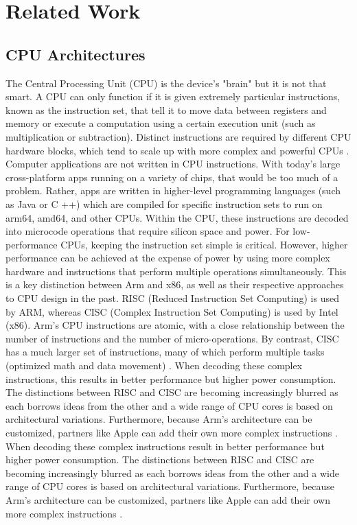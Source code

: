 \section{Related Work}


\subsection {CPU Architectures}
The Central Processing Unit (CPU) is the device's "brain" but it is not that smart.
A CPU can only function if it is given extremely particular instructions, 
known as the instruction set, 
that tell it to move data between registers and memory or execute a computation using a certain execution unit 
(such as multiplication or subtraction). 
Distinct instructions are required by different CPU hardware blocks, which tend to scale up with more complex and powerful CPUs 
\cite{Publikat0:online}.
Computer applications are not written in CPU instructions. 
With today's large cross-platform apps running on a variety of chips, that would be too much of a problem. 
Rather, apps are written in higher-level programming languages (such as Java or C ++) 
which are compiled for specific instruction sets to run on arm64, amd64, and other CPUs. 
Within the CPU, these instructions are decoded into microcode operations that require silicon space and power. 
For low-performance CPUs, keeping the instruction set simple is critical. 
However, higher performance can be achieved at the expense of power by using more complex hardware and 
instructions that perform multiple operations simultaneously. 
This is a key distinction between Arm and x86, as well as their respective approaches to CPU design in the past\cite{CPUdesig69:online}.
RISC (Reduced Instruction Set Computing) is used by ARM,
whereas CISC (Complex Instruction Set Computing) is used by Intel (x86). 
Arm's CPU instructions are atomic, with a close relationship between the number of instructions and the number of micro-operations. By contrast, CISC has a much larger set of instructions, 
many of which perform multiple tasks (optimized math and data movement)
\cite{RISCvers27:online}.
When decoding these complex instructions, this results in better performance but higher power consumption. 
The distinctions between RISC and CISC are becoming increasingly blurred as each borrows ideas from the other 
and a wide range of CPU cores is based on architectural variations. 
Furthermore, because Arm's architecture can be customized, partners like Apple can add their own more complex instructions
\cite{ProQuest63:online}.
When decoding these complex instructions result in better performance but higher power consumption. 
The distinctions between RISC and CISC are becoming increasingly blurred as each borrows ideas from the other 
and a wide range of CPU cores is based on architectural variations. 
Furthermore, because Arm's architecture can be customized, partners like Apple can add their own more complex instructions 
\cite{Heteroge64:online}.





